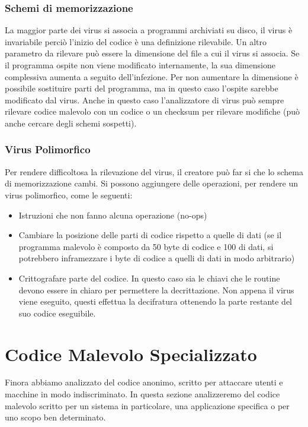 \subsubsection{Schemi di memorizzazione}
La maggior parte dei virus si associa a programmi archiviati su disco, il virus è invariabile perciò l'inizio del codice è una definizione rilevabile. Un altro parametro da rilevare può essere la dimensione del file a cui il virus si associa. Se il programma ospite  non viene modificato internamente, la sua dimensione complessiva aumenta a seguito dell'infezione. Per non aumentare la dimensione è possibile  sostituire parti del programma, ma in questo caso l'ospite sarebbe modificato dal virus.
\newline
Anche in questo caso l'analizzatore di virus può sempre rilevare codice malevolo con un codice o un checksum per rilevare modifiche (può anche cercare degli schemi sospetti).
\subsubsection{Virus Polimorfico}
Per rendere difficoltosa la rilevazione del virus, il creatore può far si che lo schema di memorizzazione cambi. Si possono aggiungere delle operazioni, per rendere un virus polimorfico, come le seguenti:

\begin{itemize}

	\item Istruzioni che non fanno alcuna operazione (no-ops)
	\item Cambiare la posizione delle parti di codice rispetto a quelle di dati (se il programma malevolo è composto da 50 byte di codice e 100 di dati, si potrebbero inframezzare i byte di codice a quelli di dati in modo arbitrario)
	\item Crittografare parte del codice. In questo caso sia le chiavi che le routine devono essere in chiaro per permettere la decrittazione. Non appena il virus viene eseguito, questi effettua la decifratura ottenendo la parte restante del suo codice eseguibile.
	
\end{itemize}

\section{Codice Malevolo Specializzato}
Finora abbiamo analizzato del codice anonimo, scritto per attaccare utenti e macchine in modo indiscriminato.
In questa sezione analizzeremo del codice malevolo scritto per un sistema in particolare, una applicazione specifica o per uno scopo ben determinato.
